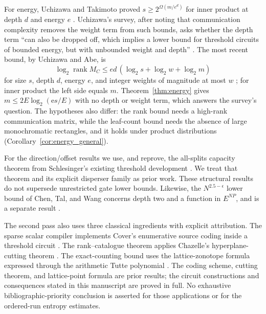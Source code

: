 \documentclass[11pt]{article}
\theoremstyle{definition}
\newcommand{\rank}{\operatorname{rank}}
\newcommand{\Eul}{\mathrm e}
\begin{document}
For energy, Uchizawa and Takimoto proved \(s\ge2^{\Omega(m/e^d)}\) for inner product at depth \(d\) and energy \(e\) \cite{UT08}. Uchizawa's survey, after noting that communication complexity removes the weight term from such bounds, asks whether the depth term ``can also be dropped off, which implies a lower bound for threshold circuits of bounded energy, but with unbounded weight and depth'' \cite{Uchizawa14}. The most recent bound, by Uchizawa and Abe, is
\[
 \log_2\rank M_C\le ed\,(\log_2s+\log_2w+\log_2m)
\]
for size \(s\), depth \(d\), energy \(e\), and integer weights of magnitude at most \(w\) \cite{UA23}; for inner product the left side equals \(m\). Theorem~\ref{thm:energy} gives \(m\le2E\log_2(\Eul s/E)\) with no depth or weight term, which answers the survey's question. The hypotheses also differ: the rank bound needs a high-rank communication matrix, while the leaf-count bound needs the absence of large monochromatic rectangles, and it holds under product distributions (Corollary~\ref{cor:energy_general}).

For the direction/offset results we use, and reprove, the all-splits capacity theorem from Schlesinger's existing threshold development \cite{Schlesinger26}. We treat that theorem and its explicit disperser family as prior work. These structural results do not supersede unrestricted gate lower bounds. Likewise, the \(N^{2.5-\epsilon}\) lower bound of Chen, Tal, and Wang concerns depth two and a function in \(E^{NP}\), and is a separate result \cite{CTW26}.

The second pass also uses three classical ingredients with explicit attribution. The sparse scalar compiler implements Cover's enumerative source coding inside a threshold circuit \cite{Cover73}. The rank--catalogue theorem applies Chazelle's hyperplane-cutting theorem \cite{Chazelle93}. The exact-counting bound uses the lattice-zonotope formula expressed through the arithmetic Tutte polynomial \cite{DM11}. The coding scheme, cutting theorem, and lattice-point formula are prior results; the circuit constructions and consequences stated in this manuscript are proved in full. No exhaustive bibliographic-priority conclusion is asserted for those applications or for the ordered-run entropy estimates.
\end{document}
